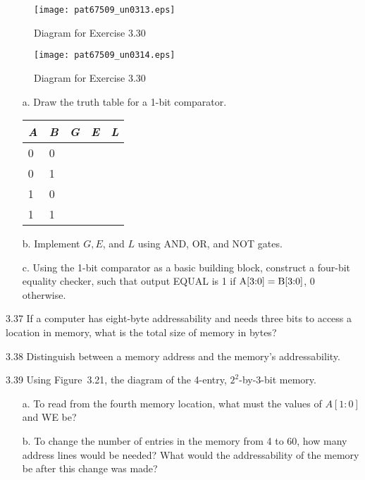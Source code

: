 \documentclass{patt}
\begin{document}
\begin{exercises}
\begin{figure}[!h]
\centerline{\texttt{[image: pat67509\_un0313.eps]}}
\caption{Diagram for Exercise 3.30}
\end{figure}

\begin{figure}[!h]
\centerline{\texttt{[image: pat67509\_un0314.eps]}}
\caption{Diagram for Exercise 3.30}
\end{figure}


\smallskip
\begin{enumerate}[a.]
\item[a.] Draw the truth table for a 1-bit comparator.

\begin{inlinetable}
\begin{tabular}{ll|lll}
\hline\tabcolsep=6pt
\rule{0pt}{10pt} {\it A} & {\it B} &  {\it G} &  {\it E} & {\it L}\\
\hline
0 & 0& \\
0 & 1& \\
1 & 0& \\
1 & 1& \\
\hline
\end{tabular}
\end{inlinetable}

\item[b.] Implement $G, E$, and $L$ using AND, OR, and NOT gates.

\item[c.] Using the 1-bit comparator as a basic building block,
  construct a four-bit equality checker, such that output EQUAL is 1
  if ${\rm A}[3{:}0]={\rm B}[3{:}0]$, 0 otherwise.
\end{enumerate}



\item[3.37] If a computer has eight-byte addressability and needs
  three bits to access a location in memory, what is the total size of
  memory in bytes?

\item[3.38] Distinguish between a memory address and the memory's
  addressability.

\item[3.39] Using Figure~3.21, the diagram of the 4-entry,
  $2^2$-by-3-bit memory.
\begin{enumerate}[c.]
\item[a.] To read from the fourth memory location, what must the
  values of $A[1{:}0]$ and WE be?
\item[b.] To change the number of entries in the memory from 4 to 60,
  how many address lines would be needed? What would the
  addressability of the memory be after this change was made?


\end{enumerate}
\end{exercises}
\end{document}

